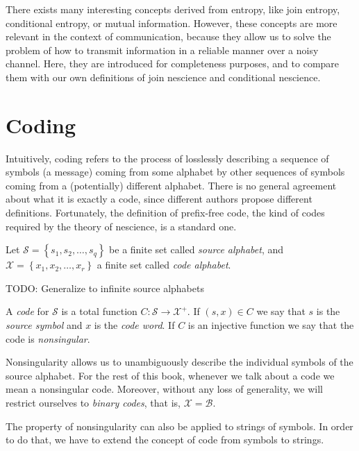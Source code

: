 There exists many interesting concepts derived from entropy, like join entropy, conditional entropy, or mutual information. However, these concepts are more relevant in the context of communication, because they allow us to solve the problem of how to transmit information in a reliable manner over a noisy channel. Here, they are introduced for completeness purposes, and to compare them with our own definitions of join nescience and conditional nescience.

%
%

\section{Coding}
\label{Codes}

Intuitively, coding refers to the process of losslessly describing a sequence of symbols (a message) coming from some alphabet by other sequences of symbols coming from a (potentially) different alphabet. There is no general agreement about what it is exactly a code, since different authors propose different definitions. Fortunately, the definition of prefix-free code, the kind of codes required by the theory of nescience, is a standard one.

Let $\mathcal{S}=\left\{ s_{1},s_{2},\ldots,s_{q}\right\}$ be a finite set called \emph{source alphabet}, and $\mathcal{X}=\left\{ x_{1}, x_{2}, \ldots, x_{r} \right\}$ a finite set called \emph{code alphabet}.

{\color{red} TODO: Generalize to infinite source alphabets}

\begin{definition}[Code]
A \emph{code} for $\mathcal{S}$ is a total function $C:\mathcal{S}\rightarrow\mathcal{X}^{+}$. If $(s,x) \in C$ we say that $s$ is the \emph{source symbol} and $x$ is the \emph{code word}. If $C$ is an injective function we say that the code is \emph{nonsingular}.
\end{definition}

Nonsingularity allows us to unambiguously describe the individual symbols of the source alphabet. For the rest of this book, whenever we talk about a code we mean a nonsingular code. Moreover, without any loss of generality, we will restrict ourselves to \emph{binary codes}, that is, $\mathcal{X} = \mathcal{B}$.

The property of nonsingularity can also be applied to strings of symbols. In order to do that, we have to extend the concept of code from symbols to strings.

